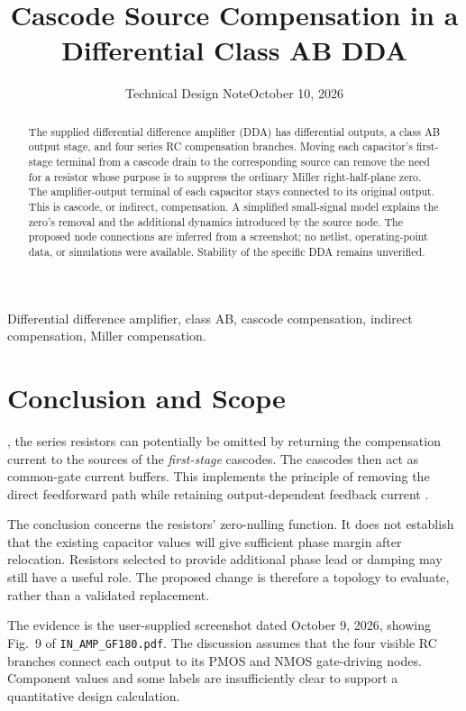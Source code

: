 \documentclass[10pt,journal]{IEEEtran}
\begin{document}
\title{Cascode Source Compensation in a Differential Class AB DDA}
\author{Technical Design Note\quad October 10, 2026}
\maketitle
\begin{abstract}
The supplied differential difference amplifier (DDA) has differential outputs, a class AB output stage, and four series RC compensation branches. Moving each capacitor's first-stage terminal from a cascode drain to the corresponding source can remove the need for a resistor whose purpose is to suppress the ordinary Miller right-half-plane zero. The amplifier-output terminal of each capacitor stays connected to its original output. This is cascode, or indirect, compensation. A simplified small-signal model explains the zero's removal and the additional dynamics introduced by the source node. The proposed node connections are inferred from a screenshot; no netlist, operating-point data, or simulations were available. Stability of the specific DDA remains unverified.
\end{abstract}
\begin{IEEEkeywords}
Differential difference amplifier, class AB, cascode compensation, indirect compensation, Miller compensation.
\end{IEEEkeywords}

\section{Conclusion and Scope}
, the series resistors can potentially be omitted by returning the compensation current to the sources of the \emph{first-stage} cascodes. The cascodes then act as common-gate current buffers. This implements the principle of removing the direct feedforward path while retaining output-dependent feedback current \cite{ahuja,saxena2008}.

The conclusion concerns the resistors' zero-nulling function. It does not establish that the existing capacitor values will give sufficient phase margin after relocation. Resistors selected to provide additional phase lead or damping may still have a useful role. The proposed change is therefore a topology to evaluate, rather than a validated replacement.

The evidence is the user-supplied screenshot dated October 9, 2026, showing Fig.~9 of \texttt{IN\_AMP\_GF180.pdf}. The discussion assumes that the four visible RC branches connect each output to its PMOS and NMOS gate-driving nodes. Component values and some labels are insufficiently clear to support a quantitative design calculation.
\end{document}
